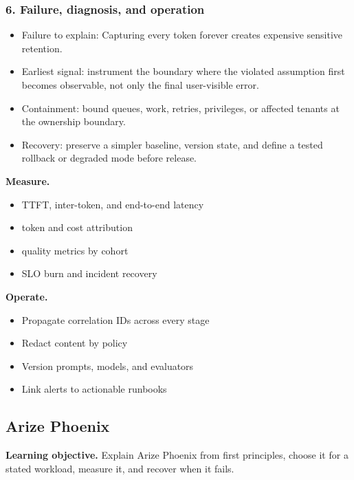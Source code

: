 \subsubsection*{6. Failure, diagnosis, and operation}
\begin{itemize}
\item Failure to explain: Capturing every token forever creates expensive sensitive retention.
\item Earliest signal: instrument the boundary where the violated assumption first becomes observable, not only the final user-visible error.
\item Containment: bound queues, work, retries, privileges, or affected tenants at the ownership boundary.
\item Recovery: preserve a simpler baseline, version state, and define a tested rollback or degraded mode before release.
\end{itemize}
\textbf{Measure.}\begin{itemize}
\item TTFT, inter-token, and end-to-end latency
\item token and cost attribution
\item quality metrics by cohort
\item SLO burn and incident recovery
\end{itemize}
\textbf{Operate.}\begin{itemize}
\item Propagate correlation IDs across every stage
\item Redact content by policy
\item Version prompts, models, and evaluators
\item Link alerts to actionable runbooks
\end{itemize}
\subsection{Arize Phoenix}
\textbf{Learning objective.} Explain Arize Phoenix from first principles, choose it for a stated workload, measure it, and recover when it fails.
